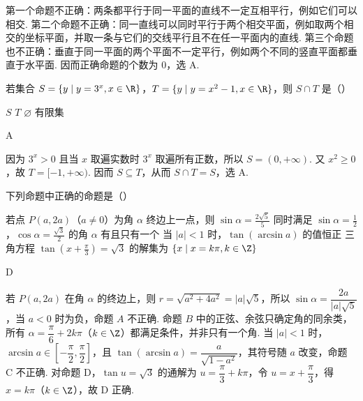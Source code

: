 \begin{solution}
第一个命题不正确：两条都平行于同一平面的直线不一定互相平行，例如它们可以相交. 第二个命题不正确：同一直线可以同时平行于两个相交平面，例如取两个相交的坐标平面，并取一条与它们的交线平行且不在任一平面内的直线. 第三个命题也不正确：垂直于同一平面的两个平面不一定平行，例如两个不同的竖直平面都垂直于水平面. 因而正确命题的个数为 \(0\)，选 A.
\end{solution}

\begin{problem}
若集合 \( S = \{y \mid y = 3^x, x \in \R\} \)，\( T = \{y \mid y = x^2 - 1, x \in \R\} \)，则 \( S \cap T \) 是（\quad）

\choices
    {\(S\)}
    {\(T\)}
    {\(\varnothing\)}
    {有限集}
\end{problem}

\begin{answer}
A
\end{answer}

\begin{solution}
因为 \(3^x>0\) 且当 \(x\) 取遍实数时 \(3^x\) 取遍所有正数，所以 \(S=(0,+\infty)\). 又 \(x^2\geqslant0\)，故 \(T=[-1,+\infty)\). 因而 \(S\subseteq T\)，从而 \(S\cap T=S\)，选 A.
\end{solution}

\begin{problem}
下列命题中正确的命题是（\quad）

\choices
    {若点 \(P(a, 2a)\)（\(a \neq 0\)）为角 \(\alpha\) 终边上一点，则 \(\sin \alpha = \frac{2\sqrt{5}}{5}\)}
    {同时满足 \(\sin \alpha = \frac{1}{2}\)，\(\cos \alpha = \frac{\sqrt{3}}{2}\) 的角 \(\alpha\) 有且只有一个}
    {当 \(|a| < 1\) 时，\(\tan (\arcsin a)\) 的值恒正}
    {三角方程 \(\tan \left(x + \frac{\pi}{3}\right) = \sqrt{3}\) 的解集为 \(\{x \mid x = k\pi, k \in \Z\}\)}
\end{problem}

\begin{answer}
D
\end{answer}

\begin{solution}
若 \(P(a,2a)\) 在角 \(\alpha\) 的终边上，则 \(r=\sqrt{a^2+4a^2}=|a|\sqrt{5}\)，所以 \(\sin\alpha=\dfrac{2a}{|a|\sqrt{5}}\)，当 \(a<0\) 时为负，命题 \(A\) 不正确. 命题 \(B\) 中的正弦、余弦只确定角的同余类，所有 \(\alpha=\dfrac{\pi}{6}+2k\pi\)（\(k\in\Z\)）都满足条件，并非只有一个角. 当 \(|a|<1\) 时，\(\arcsin a\in\left[-\dfrac{\pi}{2},\dfrac{\pi}{2}\right]\)，且 \(\tan(\arcsin a)=\dfrac{a}{\sqrt{1-a^2}}\)，其符号随 \(a\) 改变，命题 C 不正确. 对命题 D，\(\tan u=\sqrt{3}\) 的通解为 \(u=\dfrac{\pi}{3}+k\pi\)，令 \(u=x+\dfrac{\pi}{3}\)，得 \(x=k\pi\)（\(k\in\Z\)），故 D 正确.
\end{solution}

